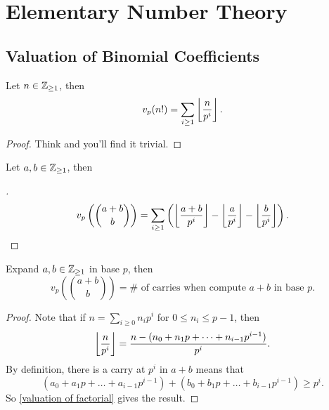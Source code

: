 \section{Elementary Number Theory}

\subsection{Valuation of Binomial Coefficients}

\begin{proposition}\label{valuation of factorial}
    Let $n\in\mathbb{Z}_{\ge 1}$, then \[v_p(n!) = \sum_{i\ge 1}\left\lfloor \frac{n }{p^i}\right\rfloor.\]
\end{proposition}
\begin{proof}
    Think and you'll find it trivial.
\end{proof}

\begin{corollary}\label{valuation of binomial coeff}
    Let $a, b\in\mathbb{Z}_{\ge 1}$, then
    \vspace{-1em}\begin{proof}[]
        \[v_p\left( \binom{a + b}{b} \right)
        = \sum_{i\ge 1}
        \left( \left\lfloor \frac{a + b}{p^i}\right\rfloor
            - \left\lfloor \frac{a }{p^i }\right\rfloor
            - \left\lfloor \frac{b}{p^i}\right\rfloor \right).\qedhere\]    
    \end{proof}
\end{corollary}
\begin{corollary}[Kummer]
    Expand $a, b\in\mathbb{Z}_{\ge 1}$ in base $p$,
    then \[v_p\left( \binom{a + b}{b} \right) = \#\text{ of carries when compute } a + b \text{ in base } p.\]
\end{corollary}
\begin{proof}
    Note that if $n = \sum_{i\ge 0}n_ip^i$ for $0\le n_i\le p - 1$,
    then \[\left\lfloor \frac{n}{p^i}\right\rfloor = \frac{n - (n_0 + n_1p + \dots + n_{i-1}p^{i-1})}{p^i}.\]
    By definition, there is a carry at $p^i$ in $a + b$ means that
    \[(a_0 + a_1p + \dots + a_{i-1}p^{i-1}) + (b_0 + b_1p + \dots + b_{i-1}p^{i-1})\ge p^{i}.\]
    So \cref{valuation of factorial} gives the result.
\end{proof}